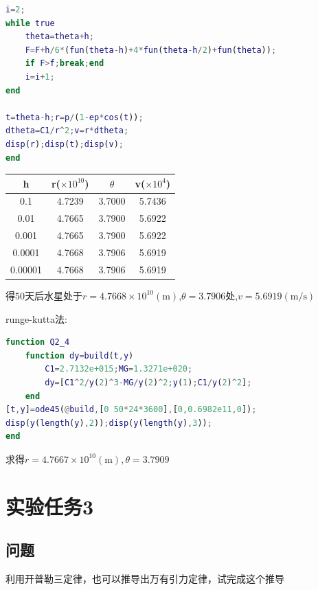 \documentclass[12pt]{article}
\begin{document}
\begin{CJK*}{UTF8}{gbsn}
\begin{enumerate}
\begin{lstlisting}[language=matlab]
i=2;
while true
    theta=theta+h;
    F=F+h/6*(fun(theta-h)+4*fun(theta-h/2)+fun(theta));
    if F>f;break;end
    i=i+1;
end

t=theta-h;r=p/(1-ep*cos(t));
dtheta=C1/r^2;v=r*dtheta;
disp(r);disp(t);disp(v);
end

\end{lstlisting}

\begin{tabular}{|c|c|c|c|}
\hline
h&r($\times10^{10}$) & $\theta$ & v($\times10^4$) \\
\hline
 0.1&4.7239&3.7000&5.7436\\
\hline
0.01&4.7665&3.7900&5.6922\\
\hline
0.001&4.7665&3.7900&5.6922\\
\hline
0.0001&4.7668&3.7906&5.6919\\
\hline
0.00001&4.7668&3.7906&5.6919 \\
\hline
\end{tabular}

得$50$天后水星处于$r=4.7668\times10^{10}\mathrm{(m)}$,$\theta=3.7906$处,$v=5.6919\mathrm{(m/s)}$

runge-kutta法:
\begin{lstlisting}[language=matlab]
function Q2_4
    function dy=build(t,y)
        C1=2.7132e+015;MG=1.3271e+020;
        dy=[C1^2/y(2)^3-MG/y(2)^2;y(1);C1/y(2)^2];
    end
[t,y]=ode45(@build,[0 50*24*3600],[0,0.6982e11,0]);
disp(y(length(y),2));disp(y(length(y),3));
end
\end{lstlisting}
求得$  r=4.7667\times10^{10}\mathrm{(m)},\theta=3.7909$\\

\end{enumerate}

\section{实验任务3}
\subsection*{问题}
利用开普勒三定律，也可以推导出万有引力定律，试完成这个推导

\end{CJK*}
\end{document}
